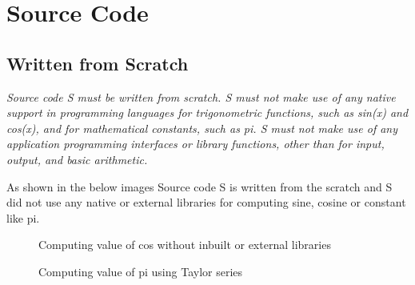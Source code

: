 \section{Source Code}
\subsection{Written from Scratch}
\begin{flushleft}
  \textit{Source code S must be written from scratch. S must not make use of any native support in programming languages for trigonometric functions, such as sin(x) and cos(x), and for mathematical constants, such as pi. S must not make use of any application programming interfaces or library functions, other than for input, output, and basic arithmetic.}
\end{flushleft}
\begin{flushleft}
    As shown in the below images Source code S is written from the scratch and S did not use any native or external libraries for computing sine, cosine or constant like pi.
\end{flushleft}
\begin{figure}[h!]
    \centering
    \vspace{.5cm}
    \caption{Computing value of cos without inbuilt or external libraries}
    \label{fig:cos }
  \end{figure}
  \begin{figure}[h!]
    \centering
    \vspace{.5cm}
    \caption{Computing value of pi using Taylor series}
    \label{fig:pi }
  \end{figure}
  \pagebreak
